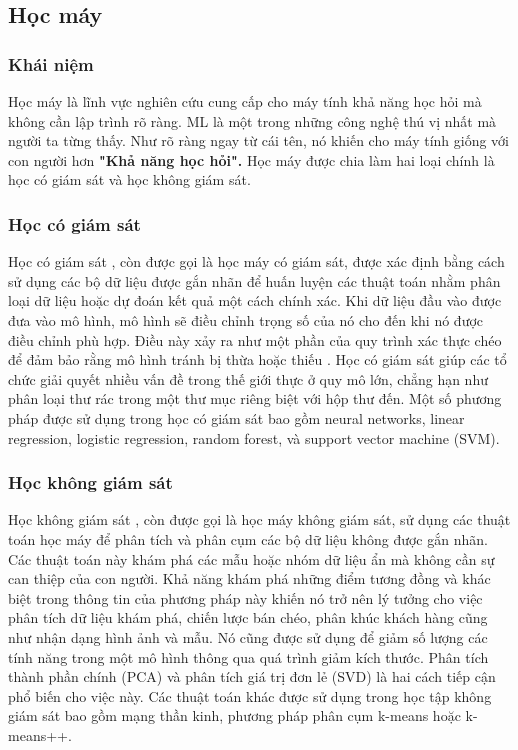 \subsection{Học máy}
\subsubsection*{Khái niệm}
Học máy là lĩnh vực nghiên cứu cung cấp cho máy tính khả năng học hỏi mà không cần lập trình rõ ràng. ML là một trong những công nghệ thú vị nhất mà người ta từng thấy. Như rõ 
ràng ngay từ cái tên, nó khiến cho máy tính giống với con người hơn \textbf{"Khả năng học hỏi".}
Học máy được chia làm hai loại chính là học có giám sát và học không giám sát.

\subsubsection*{Học có giám sát}
Học có giám sát , còn được gọi là học máy có giám sát, được xác định bằng cách sử dụng các bộ dữ liệu được gắn nhãn để huấn luyện các thuật toán nhằm phân loại dữ liệu hoặc dự đoán kết 
quả một cách chính xác. Khi dữ liệu đầu vào được đưa vào mô hình, mô hình sẽ điều chỉnh trọng số của nó cho đến khi nó được điều chỉnh phù hợp. Điều này xảy ra như một phần của quy trình 
xác thực chéo để đảm bảo rằng mô hình tránh bị thừa  hoặc  thiếu . Học có giám sát giúp các tổ chức giải quyết nhiều vấn đề trong thế giới thực ở quy mô lớn, chẳng hạn như phân loại 
thư rác trong một thư mục riêng biệt với hộp thư đến. Một số phương pháp được sử dụng trong học có giám sát bao gồm neural networks, linear regression, logistic regression, 
random forest, và support vector machine (SVM).  

\subsubsection*{Học không giám sát}
Học không giám sát , còn được gọi là học máy không giám sát, sử dụng các thuật toán học máy để phân tích và phân cụm các bộ dữ liệu không được gắn nhãn. Các thuật toán này khám phá các mẫu 
hoặc nhóm dữ liệu ẩn mà không cần sự can thiệp của con người. Khả năng khám phá những điểm tương đồng và khác biệt trong thông tin của phương pháp này khiến nó trở nên lý tưởng cho việc phân 
tích dữ liệu khám phá, chiến lược bán chéo, phân khúc khách hàng cũng như nhận dạng hình ảnh và mẫu. Nó cũng được sử dụng để giảm số lượng các tính năng trong một mô hình thông qua quá trình 
giảm kích thước. Phân tích thành phần chính (PCA) và phân tích giá trị đơn lẻ (SVD) là hai cách tiếp cận phổ biến cho việc này. Các thuật toán khác được sử dụng trong học tập không giám sát bao 
gồm mạng thần kinh, phương pháp phân cụm k-means hoặc k-means++.

